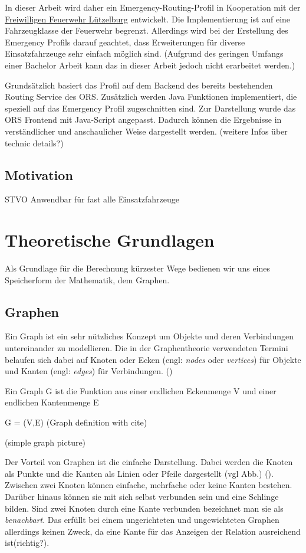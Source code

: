 \documentclass[10pt,a4paper]{article}
\begin{document}
In dieser Arbeit wird daher ein Emergency-Routing-Profil in Kooperation mit der \href{https://www.feuerwehr-luetzelburg.de}{Freiwilligen Feuerwehr Lützelburg} entwickelt. Die Implementierung ist auf eine Fahrzeugklasse der Feuerwehr begrenzt. Allerdings wird bei der Erstellung des Emergency Profils darauf geachtet, dass Erweiterungen für diverse Einsatzfahrzeuge sehr einfach möglich sind. (Aufgrund des geringen Umfangs einer Bachelor Arbeit kann das in dieser Arbeit jedoch nicht erarbeitet werden.)


Grundsätzlich basiert das Profil auf dem Backend des bereits bestehenden Routing Service des ORS. Zusätzlich werden Java Funktionen implementiert, die speziell auf das Emergency Profil zugeschnitten sind. Zur Darstellung wurde das ORS Frontend mit Java-Script angepasst. Dadurch können die Ergebnisse in verständlicher und anschaulicher Weise dargestellt werden.
(weitere Infos über technic details?)

\subsection{Motivation}

STVO
Anwendbar für fast alle Einsatzfahrzeuge 

\section{Theoretische Grundlagen}

Als Grundlage für die Berechnung kürzester Wege bedienen wir uns eines Speicherform der Mathematik, dem Graphen.

\subsection{Graphen}

Ein Graph ist ein sehr nützliches Konzept um Objekte und deren Verbindungen untereinander zu modellieren. Die in der Graphentheorie verwendeten Termini belaufen sich dabei auf Knoten oder Ecken (engl: \textit{nodes} oder \textit{vertices}) für Objekte und Kanten (engl: \textit{edges}) für Verbindungen.
(\cite[49]{kurt})

Ein Graph G ist die Funktion aus einer endlichen Eckenmenge V und einer endlichen Kantenmenge E

	G = (V,E)
(Graph definition with cite)


(simple graph picture)

Der Vorteil von Graphen ist die einfache Darstellung. Dabei werden die Knoten als Punkte und die Kanten als Linien oder Pfeile dargestellt (vgl Abb.) (\cite[49]{kurt}). Zwischen zwei Knoten können einfache, mehrfache oder keine Kanten bestehen. Darüber hinaus können sie mit sich selbst verbunden sein und eine Schlinge bilden. Sind zwei Knoten durch eine Kante verbunden bezeichnet man sie als \textit{benachbart}. Das erfüllt bei einem ungerichteten und ungewichteten Graphen allerdings keinen Zweck, da eine Kante für das Anzeigen der Relation ausreichend ist(richtig?).
\end{document}
